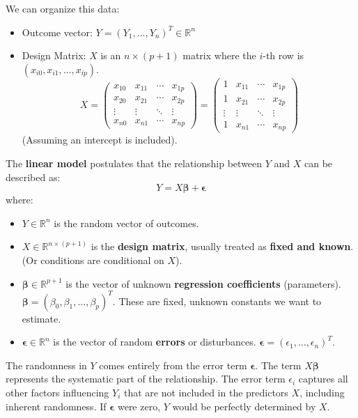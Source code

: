 \documentclass[11pt]{article}
\theoremstyle{definition}
\newcommand{\R}{\mathbb{R}} %
\newcommand{\T}{^T} %
\newcommand{\bbeta}{\bm{\beta}} %
\newcommand{\bepsilon}{\bm{\epsilon}} %
\begin{document}
We can organize this data:
\begin{itemize}
    \item Outcome vector: $Y = (Y_1, \ldots, Y_n)\T \in \R^n$
    \item Design Matrix: $X$ is an $n \times (p+1)$ matrix where the $i$-th row is $(x_{i0}, x_{i1}, \ldots, x_{ip})$.
    \[
    X = \begin{pmatrix}
    x_{10} & x_{11} & \cdots & x_{1p} \\
    x_{20} & x_{21} & \cdots & x_{2p} \\
    \vdots & \vdots & \ddots & \vdots \\
    x_{n0} & x_{n1} & \cdots & x_{np}
    \end{pmatrix} = \begin{pmatrix}
    1 & x_{11} & \cdots & x_{1p} \\
    1 & x_{21} & \cdots & x_{2p} \\
    \vdots & \vdots & \ddots & \vdots \\
    1 & x_{n1} & \cdots & x_{np}
    \end{pmatrix}
    \]
    (Assuming an intercept is included).
\end{itemize}
The \textbf{linear model} postulates that the relationship between $Y$ and $X$ can be described as:
\[
Y = X\bbeta + \bepsilon
\]
where:
\begin{itemize}
    \item $Y \in \R^n$ is the random vector of outcomes.
    \item $X \in \R^{n \times (p+1)}$ is the \textbf{design matrix}, usually treated as \textbf{fixed and known}. (Or conditions are conditional on $X$).
    \item $\bbeta \in \R^{p+1}$ is the vector of unknown \textbf{regression coefficients} (parameters). $\bbeta = (\beta_0, \beta_1, \ldots, \beta_p)\T$. These are fixed, unknown constants we want to estimate.
    \item $\bepsilon \in \R^n$ is the vector of random \textbf{errors} or disturbances. $\bepsilon = (\epsilon_1, \ldots, \epsilon_n)\T$.
\end{itemize}
The randomness in $Y$ comes entirely from the error term $\bepsilon$. The term $X\bbeta$ represents the systematic part of the relationship. The error term $\epsilon_i$ captures all other factors influencing $Y_i$ that are not included in the predictors $X$, including inherent randomness. If $\bepsilon$ were zero, $Y$ would be perfectly determined by $X$.
\end{document}
